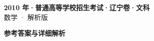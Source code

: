 \documentclass[zihao=-4, a4paper]{ctexart}
\begin{document}
\begin{center}
  {\Large\bfseries 2010 年·普通高等学校招生考试·辽宁卷·文科}\\[4pt]
  {\large 数学 · 解析版}
\end{center}
\medskip
{}

\clearpage
{}
\begin{center}{\Large\bfseries 参考答案与详细解析}\end{center}
\medskip

\end{document}
